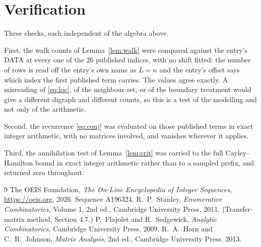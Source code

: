 \documentclass[11pt,a4paper]{article}
\theoremstyle{plain}
\theoremstyle{definition}
\begin{document}
\section{Verification}

Three checks, each independent of the algebra above.

First, the walk counts of Lemma~\ref{lem:walk} were compared against the entry's DATA at
every one of the $26$ published indices, with no shift fitted: the number of rows is
read off the entry's own name as $L=n$ and the entry's offset says which index the first
published term carries. The values agree exactly. A misreading of \eqref{eq:loc}, of the
neighbour set, or of the boundary treatment would give a different digraph and different
counts, so this is a test of the modelling and not only of the arithmetic.

Second, the recurrence \eqref{eq:conj} was evaluated on those published terms in exact
integer arithmetic, with no matrices involved, and vanishes wherever it applies.

Third, the annihilation test of Lemma~\ref{lem:crit} was carried to the full
Cayley--Hamilton bound in exact integer arithmetic rather than to a sampled prefix, and
returned zero throughout.

\begin{thebibliography}{9}
 The OEIS Foundation, \emph{The On-Line Encyclopedia of Integer
Sequences}, \url{https://oeis.org}, 2026. Sequence A196324.
 R.~P.~Stanley, \emph{Enumerative Combinatorics}, Volume 1, 2nd ed.,
Cambridge University Press, 2011. (Transfer-matrix method, Section 4.7.)
 P.~Flajolet and R.~Sedgewick, \emph{Analytic Combinatorics}, Cambridge
University Press, 2009.
 R.~A.~Horn and C.~R.~Johnson, \emph{Matrix Analysis}, 2nd ed., Cambridge
University Press, 2013.
\end{thebibliography}
\end{document}
